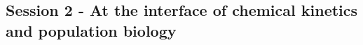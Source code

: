 \documentclass[12p]{article}
\begin{document}
%
%
%
%
%
%
%
%
%
%
%
%
%


\subsection*{Session 2 - At the interface of chemical kinetics and population biology}
\end{document}
